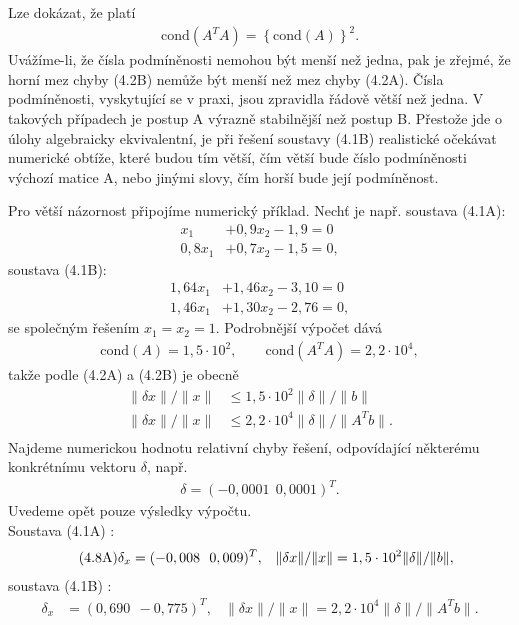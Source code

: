 Lze dokázat, že platí
%
\begin{align*}
  \tag{4.4}   \mathrm{cond} (A^TA) = \left\{\mathrm{cond}(A)\right\}^2 .
\end{align*}
%
Uvážíme-li, že čísla podmíněnosti nemohou být menší než jedna,
pak je zřejmé, že horní mez chyby (4.2B) nemůže být menší než
mez chyby (4.2A). Čísla podmíněnosti, vyskytující se v praxi,
jsou zpravidla řádově větší než jedna. V takových případech je
postup A výrazně stabilnější než postup B. Přestože jde o úlohy
algebraicky ekvivalentní, je při řešení soustavy (4.1B)
realistické očekávat numerické obtíže, které budou tím větší, čím
větší bude číslo podmíněnosti výchozí matice A, nebo jinými slovy,
čím horší bude její podmíněnost.


Pro větší názornost připojíme numerický příklad. Nechť je
např. soustava (4.1A):
%
\begin{align*}
    x_1 &+ 0,9 x_2 - 1,9 = 0\\
0,8 x_1 &+ 0,7 x_2 - 1,5 = 0 ,
\end{align*}
%
soustava  (4.1B):
\begin{align*}
  1,64 x_1 &+ 1,46 x_2 - 3,10 = 0\\
  1,46 x_1 &+ 1,30 x_2 - 2,76 = 0 ,
\end{align*}
%
se společným řešením $x_1 = x_2 = 1$. Podrobnější výpočet dává
%
\begin{align*}
  \tag{4.5}   \mathrm{cond}(A) = 1,5\cdot10^2, \qquad
              \mathrm{cond}(A^TA) = 2,2\cdot10^4,
\end{align*}
%
takže podle (4.2A) a (4.2B) je obecně
%
\begin{align*}
\tag{4.6A}   \|\delta x\| / \|x\| &\le 1,5\cdot10^2 \|\delta\|/\|b\| \\
\tag{4.6B}   \|\delta x\| / \|x\| &\le 2,2\cdot10^4 \|\delta\|/\|A^Tb\| .\\
\end{align*}
%
Najdeme numerickou hodnotu relativní chyby řešení, odpovídající
některému konkrétnímu vektoru $\delta$, např.
%
\begin{align*}
\tag{4.7} \delta =(-0,0001 ~~ 0,0001)^T .
\end{align*}
%
Uvedeme opět pouze výsledky výpočtu.\\


\noindent
Soustava (4.1A) :
\begin{align*}
\tag{4.8A}   \delta_x &= (-0,008 ~~ 0,009)^T, &
             \|\delta x\| / \|x\| = 1,5\cdot10^2 \|\delta\|/\|b\|,\hspace{2.5ex}
\end{align*}
soustava (4.1B) :
\begin{align*}
\tag{4.8B}   \delta_x &= (0,690 ~~ -0,775)^T, &
             \|\delta x\| / \|x\| = 2,2\cdot10^4 \|\delta\|/\|A^Tb\| .
\end{align*}


